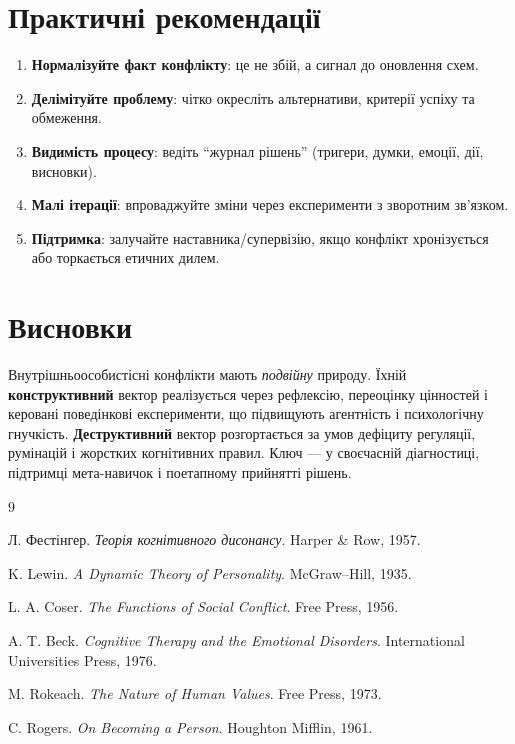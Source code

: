 \documentclass[12pt,a4paper]{article}
\begin{document}
\section{Практичні рекомендації}
\begin{enumerate}[left=6mm,label=\arabic*)]
    \item \textbf{Нормалізуйте факт конфлікту}: це не збій, а сигнал до оновлення схем.
    \item \textbf{Делімітуйте проблему}: чітко окресліть альтернативи, критерії успіху та обмеження.
    \item \textbf{Видимість процесу}: ведіть \enquote{журнал рішень} (тригери, думки, емоції, дії, висновки).
    \item \textbf{Малі ітерації}: впроваджуйте зміни через експерименти з зворотним зв'язком.
    \item \textbf{Підтримка}: залучайте наставника/супервізію, якщо конфлікт хронізується або торкається етичних дилем.
\end{enumerate}

\section{Висновки}
Внутрішньоособистісні конфлікти мають \emph{подвійну} природу. Їхній \textbf{конструктивний} вектор реалізується через рефлексію, переоцінку цінностей і керовані поведінкові експерименти, що підвищують агентність і психологічну гнучкість. \textbf{Деструктивний} вектор розгортається за умов дефіциту регуляції, румінацій і жорстких когнітивних правил. Ключ — у своєчасній діагностиці, підтримці мета-навичок і поетапному прийнятті рішень.

\begin{thebibliography}{9}

Л. Фестінгер.
\textit{Теорія когнітивного дисонансу}.
Harper \& Row, 1957.

K. Lewin.
\textit{A Dynamic Theory of Personality}.
McGraw–Hill, 1935.

L. A. Coser.
\textit{The Functions of Social Conflict}.
Free Press, 1956.

A. T. Beck.
\textit{Cognitive Therapy and the Emotional Disorders}.
International Universities Press, 1976.

M. Rokeach.
\textit{The Nature of Human Values}.
Free Press, 1973.

C. Rogers.
\textit{On Becoming a Person}.
Houghton Mifflin, 1961.

\end{thebibliography}
\end{document}
